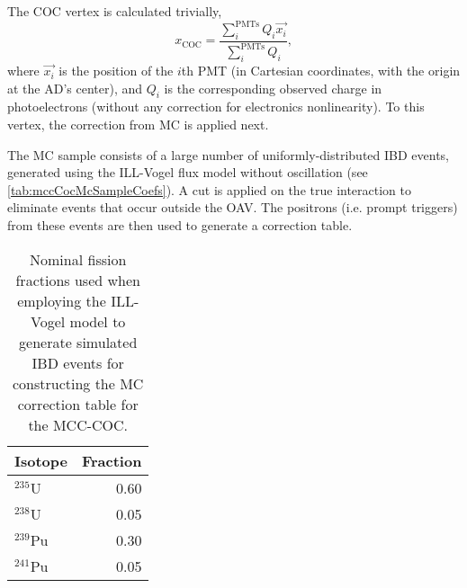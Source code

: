 \documentclass[../thesis.tex]{subfiles}
\begin{document}
The COC vertex is calculated trivially,
\begin{equation}
  x_{\mathrm{COC}} = \frac{\sum_{i}^{\mathrm{PMTs}} Q_i \vec{x_i}}{\sum_i^{\mathrm{PMTs}} Q_i},
\end{equation}
where $\vec{x_i}$ is the position of the $i$th PMT (in Cartesian coordinates, with the origin at the AD's center), and $Q_i$ is the corresponding observed charge in photoelectrons (without any correction for electronics nonlinearity). To this vertex, the correction from MC is applied next.

The MC sample consists of a large number of uniformly-distributed IBD events, generated using the ILL-Vogel flux model without oscillation (see \autoref{tab:mccCocMcSampleCoefs}). A cut is applied on the true interaction to eliminate events that occur outside the OAV. The positrons (i.e. prompt triggers) from these events are then used to generate a correction table.

\begin{table}[h]
  \begin{tabular}{lr}
    \toprule
    Isotope & Fraction \\
    \midrule
    $^{235}$U & 0.60 \\
    $^{238}$U & 0.05 \\
    $^{239}$Pu & 0.30 \\
    $^{241}$Pu & 0.05 \\
    \bottomrule
  \end{tabular}
  \caption{Nominal fission fractions used when employing the ILL-Vogel model to generate simulated IBD events for constructing the MC correction table for the MCC-COC.}
  \label{tab:mccCocMcSampleCoefs}
\end{table}
\end{document}
